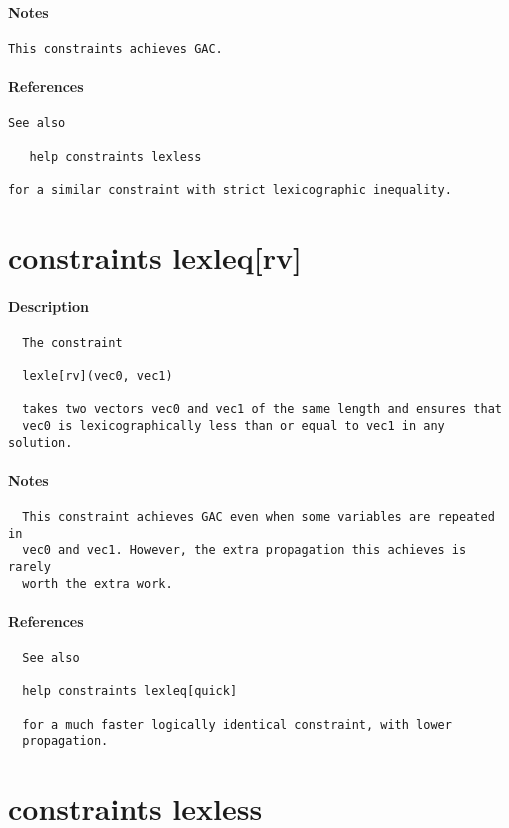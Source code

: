 \paragraph{Notes}
{\footnotesize
\begin{verbatim}
This constraints achieves GAC.
\end{verbatim}
}
\paragraph{References}
{\footnotesize
\begin{verbatim}
See also

   help constraints lexless

for a similar constraint with strict lexicographic inequality.
\end{verbatim}
}
\section{constraints lexleq[rv]}
\paragraph{Description}
{\footnotesize
\begin{verbatim}
  The constraint

  lexle[rv](vec0, vec1)

  takes two vectors vec0 and vec1 of the same length and ensures that
  vec0 is lexicographically less than or equal to vec1 in any solution.
\end{verbatim}
}
\paragraph{Notes}
{\footnotesize
\begin{verbatim}
  This constraint achieves GAC even when some variables are repeated in
  vec0 and vec1. However, the extra propagation this achieves is rarely 
  worth the extra work.
\end{verbatim}
}
\paragraph{References}
{\footnotesize
\begin{verbatim}
  See also

  help constraints lexleq[quick]

  for a much faster logically identical constraint, with lower
  propagation.
\end{verbatim}
}
\section{constraints lexless}
